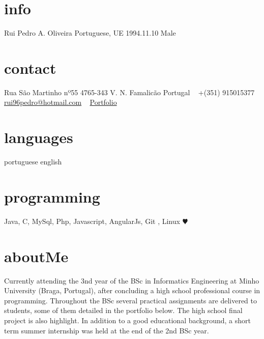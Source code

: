 \documentclass[]{friggeri-cv} %
\begin{document}


\begin{aside} %
\section{info}
Rui Pedro A. Oliveira
Portuguese, UE
1994.11.10
Male
\section{contact}
Rua São Martinho nº55
4765-343 V. N. Famalicão
Portugal
~
+(351) 915015377
~
\href{mailto:rui96pedro@hotmail.com}{rui96pedro@hotmail.com}
~
\href{https://bitbucket.org/ruiOliveiras94}{Portfolio}
~
\section{languages}
portuguese
english 
\section{programming}
Java, C, MySql,
Php, Javascript, AngularJs,
Git , Linux {\color{red} $\varheartsuit$} 
~
\end{aside}

\section{aboutMe}
Currently attending the 3nd year of the BSc in Informatics Engineering at Minho University (Braga, Portugal), after concluding a high school professional course in programming. Throughout the BSc several practical assignments are delivered to students, some of them detailed in the portfolio below. The high school final project is also highlight. In addition to a good educational background, a short term summer internship was held at the end of the 2nd BSc year.

\end{document}
